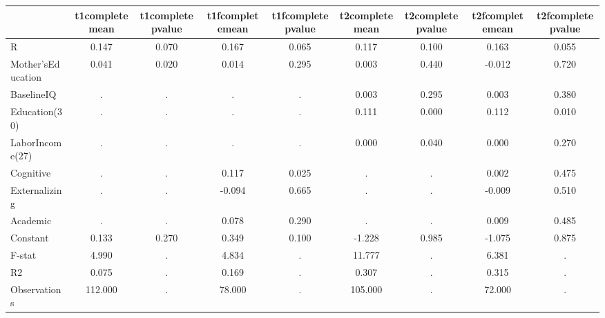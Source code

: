 \begin{table}[htbp]
\begin{tabular}{lcccccccc} \hline \hline
 & t1completemean  & t1completepvalue  & t1fcompletemean  & t1fcompletepvalue  & t2completemean  & t2completepvalue  & t2fcompletemean  & t2fcompletepvalue  \\  \hline 
R &     0.147 &     0.070 &     0.167 &     0.065 &     0.117 &     0.100 &     0.163 &     0.055 \\  
Mother'sEducation &     0.041 &     0.020 &     0.014 &     0.295 &     0.003 &     0.440 &    -0.012 &     0.720 \\  
BaselineIQ &         . &         . &         . &         . &     0.003 &     0.295 &     0.003 &     0.380 \\  
Education(30) &         . &         . &         . &         . &     0.111 &     0.000 &     0.112 &     0.010 \\  
LaborIncome(27) &         . &         . &         . &         . &     0.000 &     0.040 &     0.000 &     0.270 \\  
Cognitive &         . &         . &     0.117 &     0.025 &         . &         . &     0.002 &     0.475 \\  
Externalizing &         . &         . &    -0.094 &     0.665 &         . &         . &    -0.009 &     0.510 \\  
Academic &         . &         . &     0.078 &     0.290 &         . &         . &     0.009 &     0.485 \\  
Constant &     0.133 &     0.270 &     0.349 &     0.100 &    -1.228 &     0.985 &    -1.075 &     0.875 \\  
F-stat &     4.990 &         . &     4.834 &         . &    11.777 &         . &     6.381 &         . \\  
R2 &     0.075 &         . &     0.169 &         . &     0.307 &         . &     0.315 &         . \\  
Observations &   112.000 &         . &    78.000 &         . &   105.000 &         . &    72.000 &         . \\  
\hline \hline \end{tabular}
\end{table}
